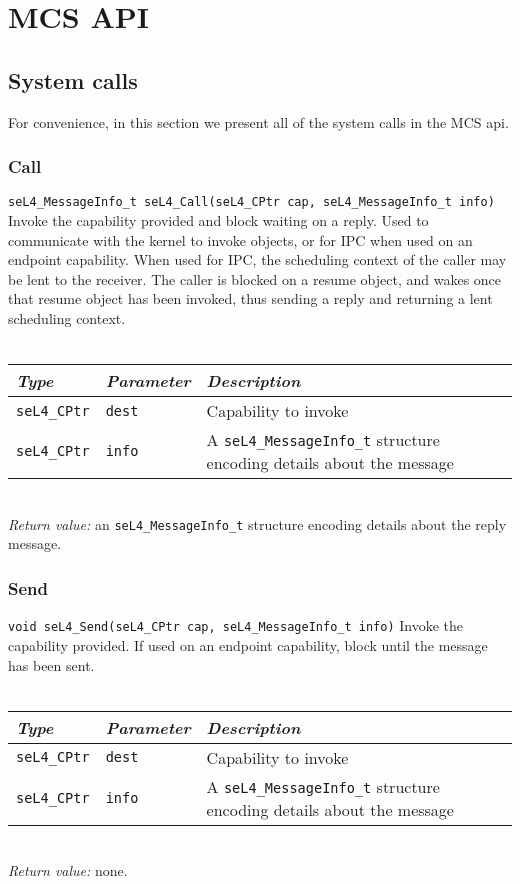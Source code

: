 
\chapter{MCS API}
\label{appendix:api}
\newcommand{\apidoc}[6]
{
    \subsection{\label{api:#1}#2}
    \texttt{#4}
    \vspace{3pt}
    \noindent
    #3\\
    \vspace{3pt}\\
    \begin{tabular}{p{0.15\textwidth}p{0.15\textwidth}p{0.7\textwidth}}\toprule
        \emph{Type} & \emph{Parameter} & \emph{Description} \\\midrule
         #5
        \bottomrule
    \end{tabular}
    \vspace{3pt}\\
    \noindent
    \textit{Return value:} #6 
}

\newcommand{\param}[3]
{
    \texttt{#1} & \texttt{#2} & #3 \\
}
\section{System calls}

For convenience, in this section we present all of the system calls in the MCS api.

\apidoc{call}
{Call}
{Invoke the capability provided and block waiting on a reply. Used to communicate with the kernel 
 to invoke objects, or for \gls{IPC} when used on an endpoint capability. When used for \gls{IPC}, 
  the scheduling context of the caller may be lent to the receiver. The caller is blocked on a
  resume object, and wakes once that resume object has been invoked, thus sending a reply and
  returning a lent scheduling context.}
  {seL4_MessageInfo_t seL4_Call(seL4_CPtr cap, seL4_MessageInfo_t info)}
{
    \param{seL4_CPtr}{dest}{Capability to invoke}
    \param{seL4_CPtr}{info}{A \texttt{seL4_MessageInfo_t} structure encoding details about the message}
}
{an \texttt{seL4_MessageInfo_t} structure encoding details about the reply message.}

\apidoc{send}
{Send}
{Invoke the capability provided. If used on an endpoint capability, block until the message has been
sent.}
{void seL4_Send(seL4_CPtr cap, seL4_MessageInfo_t info)}
{
    \param{seL4_CPtr}{dest}{Capability to invoke}
    \param{seL4_CPtr}{info}{A \texttt{seL4_MessageInfo_t} structure encoding details about the message}
}
{none.}

